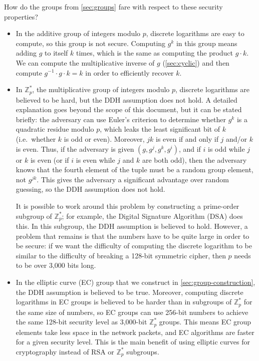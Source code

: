 \documentclass[manuscript]{acmart}
\begin{document}
How do the groups from \autoref{sec:groups} fare with respect to these security properties?
\begin{itemize}
\item In the additive group of integers modulo $p$, discrete logarithms are easy to compute, so this group is not secure.
    Computing $g^k$ in this group means adding $g$ to itself $k$ times, which is the same as computing the product $g \cdot k$.
    We can compute the multiplicative inverse of $g$ (\autoref{sec:cyclic}) and then compute $g^{-1} \cdot g \cdot k = k$ in order to efficiently recover $k$.

\item In $\mathbb{Z}_p^*$, the multiplicative group of integers modulo $p$, discrete logarithms are believed to be hard, but the DDH assumption does not hold.
    A detailed explanation goes beyond the scope of this document, but it can be stated briefly: the adversary can use Euler's criterion to determine whether $g^k$ is a quadratic residue modulo $p$, which leaks the least significant bit of $k$ (i.e.\ whether $k$ is odd or even).
    Moreover, $jk$ is even if and only if $j$ and/or $k$ is even.
    Thus, if the adversary is given $(g, g^j, g^k, g^i)$, and if $i$ is odd while $j$ or $k$ is even (or if $i$ is even while $j$ and $k$ are both odd), then the adversary knows that the fourth element of the tuple must be a random group element, not $g^{jk}$.
    This gives the adversary a significant advantage over random guessing, so the DDH assumption does not hold.

    It is possible to work around this problem by constructing a prime-order subgroup of $\mathbb{Z}_p^*$; for example, the Digital Signature Algorithm (DSA) does this.
    In this subgroup, the DDH assumption is believed to hold.
    However, a problem that remains is that the numbers have to be quite large in order to be secure: if we want the difficulty of computing the discrete logarithm to be similar to the difficulty of breaking a 128-bit symmetric cipher, then $p$ needs to be over 3,000 bits long.

\item In the elliptic curve (EC) group that we construct in \autoref{sec:group-construction}, the DDH assumption is believed to be true.
    Moreover, computing discrete logarithms in EC groups is believed to be harder than in subgroups of $\mathbb{Z}_p^*$ for the same size of numbers, so EC groups can use 256-bit numbers to achieve the same 128-bit security level as 3,000-bit $\mathbb{Z}_p^*$ groups.
    This means EC group elements take less space in the network packets, and EC algorithms are faster for a given security level.
    This is the main benefit of using elliptic curves for cryptography instead of RSA or $\mathbb{Z}_p^*$ subgroups.
\end{itemize}
\end{document}
